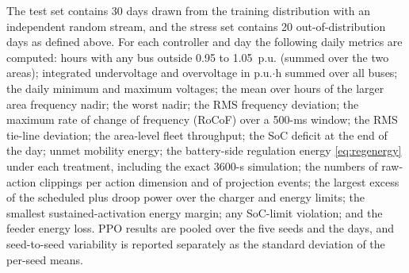 The test set contains 30 days drawn from the training distribution with
an independent random stream, and the stress set contains 20
out-of-distribution days as defined above. For each controller and day
the following daily metrics are computed: hours with any bus outside
0.95 to 1.05~p.u. (summed over the two areas); integrated undervoltage
and overvoltage in p.u.$\cdot$h summed over all buses; the daily
minimum and maximum voltages; the mean over hours of the larger area
frequency nadir; the worst nadir; the RMS frequency deviation; the
maximum rate of change of frequency (RoCoF) over a 500-ms window; the
RMS tie-line deviation; the area-level fleet throughput; the SoC
deficit at the end of the day; unmet mobility energy; the battery-side
regulation energy \eqref{eq:regenergy} under each treatment, including
the exact 3600-s simulation; the numbers of raw-action clippings per
action dimension and of projection events; the largest excess of the
scheduled plus droop power over the charger and energy limits; the
smallest sustained-activation energy margin; any SoC-limit violation;
and the feeder energy loss. PPO results are pooled over the five seeds and the
days, and seed-to-seed variability is reported separately as the
standard deviation of the per-seed means.
